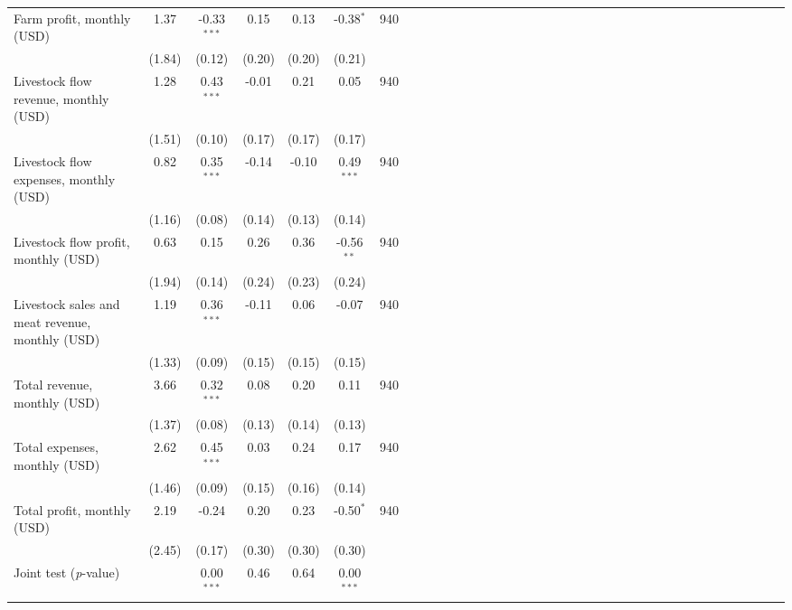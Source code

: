 {\begin{tabular}{l*{6}{SSSSSc}}
Farm profit, monthly (USD)&     1.37&-0.33$^{***}$&     0.15&     0.13&-0.38$^{*}$&      940\\
          &   (1.84)&   (0.12)&   (0.20)&   (0.20)&   (0.21)&         \\
Livestock flow revenue, monthly (USD)&     1.28&0.43$^{***}$&    -0.01&     0.21&     0.05&      940\\
          &   (1.51)&   (0.10)&   (0.17)&   (0.17)&   (0.17)&         \\
Livestock flow expenses, monthly (USD)&     0.82&0.35$^{***}$&    -0.14&    -0.10&0.49$^{***}$&      940\\
          &   (1.16)&   (0.08)&   (0.14)&   (0.13)&   (0.14)&         \\
Livestock flow profit, monthly (USD)&     0.63&     0.15&     0.26&     0.36&-0.56$^{**}$&      940\\
          &   (1.94)&   (0.14)&   (0.24)&   (0.23)&   (0.24)&         \\
Livestock sales and meat revenue, monthly (USD)&     1.19&0.36$^{***}$&    -0.11&     0.06&    -0.07&      940\\
          &   (1.33)&   (0.09)&   (0.15)&   (0.15)&   (0.15)&         \\
Total revenue, monthly (USD)&     3.66&0.32$^{***}$&     0.08&     0.20&     0.11&      940\\
          &   (1.37)&   (0.08)&   (0.13)&   (0.14)&   (0.13)&         \\
Total expenses, monthly (USD)&     2.62&0.45$^{***}$&     0.03&     0.24&     0.17&      940\\
          &   (1.46)&   (0.09)&   (0.15)&   (0.16)&   (0.14)&         \\
Total profit, monthly (USD)&     2.19&    -0.24&     0.20&     0.23&-0.50$^{*}$&      940\\
          &   (2.45)&   (0.17)&   (0.30)&   (0.30)&   (0.30)&         \\
\midrule Joint test (\emph{p}-value)&         &0.00$^{***}$&     0.46&     0.64&0.00$^{***}$&         \\
\bottomrule
\end{tabular}
}
